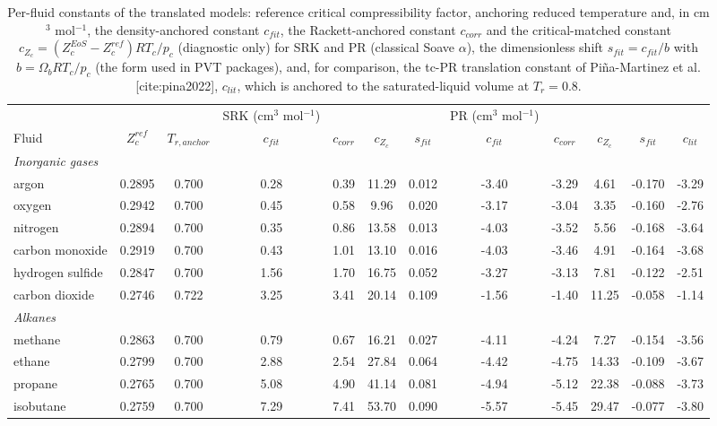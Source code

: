 \begin{table}[H]
\centering
\caption{Per-fluid constants of the translated models: reference critical compressibility factor, anchoring reduced temperature and, in cm$^3$ mol$^{-1}$, the density-anchored constant $c_{fit}$, the Rackett-anchored constant $c_{corr}$ and the critical-matched constant $c_{Z_c} = (Z_c^{EoS} - Z_c^{ref})RT_c/p_c$ (diagnostic only) for SRK and PR (classical Soave $\alpha$), the dimensionless shift $s_{fit} = c_{fit}/b$ with $b = \Omega_b R T_c/p_c$ (the form used in PVT packages), and, for comparison, the tc-PR translation constant of Pi\~na-Martinez et al. [cite:pina2022], $c_{lit}$, which is anchored to the saturated-liquid volume at $T_r = 0.8$.}
\label{tab:tabS_vt}
\small
\begin{tabular}{lccccccccccc}
\toprule
 &  &  & SRK (cm$^3$ mol$^{-1}$) &  &  &  & PR (cm$^3$ mol$^{-1}$) &  &  &  &  \\
Fluid & $Z_c^{ref}$ & $T_{r,anchor}$ & $c_{fit}$ & $c_{corr}$ & $c_{Z_c}$ & $s_{fit}$ & $c_{fit}$ & $c_{corr}$ & $c_{Z_c}$ & $s_{fit}$ & $c_{lit}$ \\
\midrule
\multicolumn{12}{l}{\emph{Inorganic gases}} \\
argon & 0.2895 & 0.700 & 0.28 & 0.39 & 11.29 & 0.012 & -3.40 & -3.29 & 4.61 & -0.170 & -3.29 \\
oxygen & 0.2942 & 0.700 & 0.45 & 0.58 & 9.96 & 0.020 & -3.17 & -3.04 & 3.35 & -0.160 & -2.76 \\
nitrogen & 0.2894 & 0.700 & 0.35 & 0.86 & 13.58 & 0.013 & -4.03 & -3.52 & 5.56 & -0.168 & -3.64 \\
carbon monoxide & 0.2919 & 0.700 & 0.43 & 1.01 & 13.10 & 0.016 & -4.03 & -3.46 & 4.91 & -0.164 & -3.68 \\
hydrogen sulfide & 0.2847 & 0.700 & 1.56 & 1.70 & 16.75 & 0.052 & -3.27 & -3.13 & 7.81 & -0.122 & -2.51 \\
carbon dioxide & 0.2746 & 0.722 & 3.25 & 3.41 & 20.14 & 0.109 & -1.56 & -1.40 & 11.25 & -0.058 & -1.14 \\
\multicolumn{12}{l}{\emph{Alkanes}} \\
methane & 0.2863 & 0.700 & 0.79 & 0.67 & 16.21 & 0.027 & -4.11 & -4.24 & 7.27 & -0.154 & -3.56 \\
ethane & 0.2799 & 0.700 & 2.88 & 2.54 & 27.84 & 0.064 & -4.42 & -4.75 & 14.33 & -0.109 & -3.67 \\
propane & 0.2765 & 0.700 & 5.08 & 4.90 & 41.14 & 0.081 & -4.94 & -5.12 & 22.38 & -0.088 & -3.73 \\
isobutane & 0.2759 & 0.700 & 7.29 & 7.41 & 53.70 & 0.090 & -5.57 & -5.45 & 29.47 & -0.077 & -3.80 \\

\end{tabular}
\end{table}
